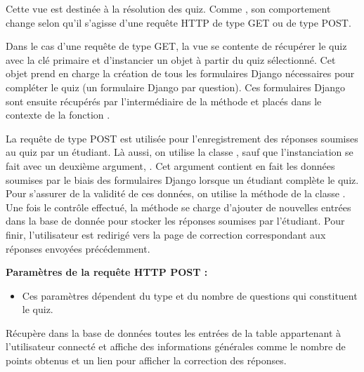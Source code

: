 \documentclass[a4,10pt,french]{sphinxmanual}
\begin{document}

\begin{fulllineitems}
\label{source:quiz.views.complete}
Cette vue est destinée à la résolution des quiz. Comme , son comportement
change selon qu'il s'agisse d'une requête HTTP de type GET ou de type POST.

Dans le cas d'une requête de type GET, la vue se contente de récupérer le quiz
avec la clé primaire  et d'instancier un objet  à partir
du quiz sélectionné. Cet objet prend en charge la création de tous les formulaires
Django nécessaires pour compléter le quiz (un formulaire Django par question).
Ces formulaires Django sont ensuite récupérés par l'intermédiaire de la méthode
 et placés dans le contexte de la fonction .

La requête de type POST est utilisée pour l'enregistrement des réponses soumises
au quiz par un étudiant. Là aussi, on utilise la classe , sauf que
l'instanciation se fait avec un deuxième argument, . Cet argument contient
en fait les données soumises par le biais des formulaires Django lorsque un
étudiant complète le quiz. Pour s'assurer de la validité de ces données, on
utilise la méthode  de la classe . Une fois le
contrôle effectué, la méthode  se charge d'ajouter de nouvelles
entrées dans la base de donnée pour stocker les réponses soumises par l'étudiant.
Pour finir, l'utilisateur est redirigé vers la page de correction correspondant
aux réponses envoyées précédemment.

\textbf{Paramètres de la requête HTTP POST :}
\begin{itemize}
\item {} 
Ces paramètres dépendent du type et du nombre de questions qui constituent le quiz.

\end{itemize}

\end{fulllineitems}


\begin{fulllineitems}
\label{source:quiz.views.completed_quizzes}
Récupère dans la base de données toutes les entrées de la table 
appartenant à l'utilisateur connecté et affiche des informations générales comme
le nombre de points obtenus et un lien pour afficher la correction des réponses.

\end{fulllineitems}
\end{document}
